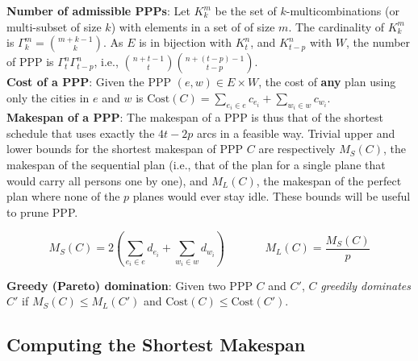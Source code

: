 \documentclass{llncs}
\begin{document}
\noindent
{\bf Number of admissible PPPs}: Let $K^{m}_{k}$ be the set of $k$-multicombinations (or multi-subset of size $k$) with elements in a set of of size $m$. The cardinality of $K^{m}_{k}$ is $\Gamma^{m}_{k} = {m+k-1 \choose k}$. As $E$ is in bijection with $K^{n}_{t}$, and $K^{n}_{t-p}$ with $W$, the number of PPP is $\Gamma^{n}_{t} \Gamma^{n}_{t-p}$, i.e., ${n+t-1 \choose t}{n+(t-p)-1 \choose t-p}$.\\

\noindent
{\bf Cost of a PPP}: Given the PPP $(e,w) \in E \times W$, the cost of {\bf any} plan using only the cities in $e$ and $w$ is $\text{Cost}(C) = \underset{{e_i \in e}}{\sum} c_{e_i} + \underset{{w_i \in w}}{\sum} c_{w_i}$.\\

\noindent
{\bf Makespan of a PPP}: The makespan of a PPP is thus that of the shortest schedule that uses exactly the $4t-2p$ arcs in a feasible way. Trivial upper and lower bounds for the shortest makespan of PPP $C$ are respectively $M_S(C)$, the makespan of the sequential plan (i.e., that of the plan for a single plane that would carry all persons one by one), and $M_L(C)$, the makespan of the perfect plan where none of the $p$ planes would ever stay idle. These bounds will be useful to prune PPP.

$$M_S(C) = 2 (\underset{{e_i \in e}}{\sum} d_{e_i} + \underset{{w_i \in w}}{\sum} d_{w_i}) ~~~~~~~~~~~~~~~~ M_L(C) = \frac{M_S(C)}{p}$$

\noindent
{\bf Greedy (Pareto) domination}: Given two PPP $C$ and $C'$, $C$ {\it greedily dominates} $C'$ if $M_S(C) \leq M_L(C')$ and $\mbox{Cost}(C) \leq \mbox{Cost}(C')$.

\subsection{Computing the Shortest Makespan} \label{computingMakespan}
\end{document}
